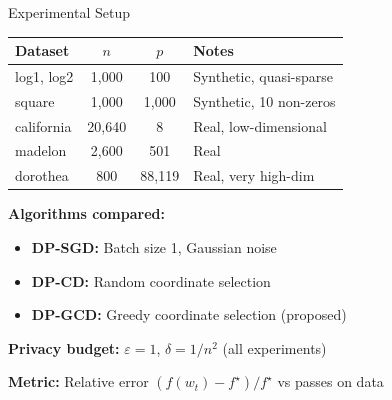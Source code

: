 \documentclass[10pt]{beamer}
\begin{document}
\begin{frame}{Experimental Setup}
\begin{table}
\scriptsize
\begin{tabular}{@{}lccl@{}}
\toprule
\textbf{Dataset} & $n$ & $p$ & \textbf{Notes} \\
\midrule
log1, log2 & 1,000 & 100 & Synthetic, quasi-sparse \\
square & 1,000 & 1,000 & Synthetic, 10 non-zeros \\
california & 20,640 & 8 & Real, low-dimensional \\
madelon & 2,600 & 501 & Real \\
dorothea & 800 & \alert{88,119} & Real, very high-dim \\
\bottomrule
\end{tabular}
\end{table}

\vspace{1em}
\textbf{Algorithms compared:}
\begin{itemize}
\item \textbf{DP-SGD:} Batch size 1, Gaussian noise
\item \textbf{DP-CD:} Random coordinate selection
\item \textbf{DP-GCD:} Greedy coordinate selection (proposed)
\end{itemize}

\vspace{0.5em}
\textbf{Privacy budget:} $\varepsilon = 1$, $\delta = 1/n^2$ (all experiments)

\vspace{0.5em}
\textbf{Metric:} Relative error $(f(w_t) - f^\star) / f^\star$ vs passes on data
\end{frame}
\end{document}
